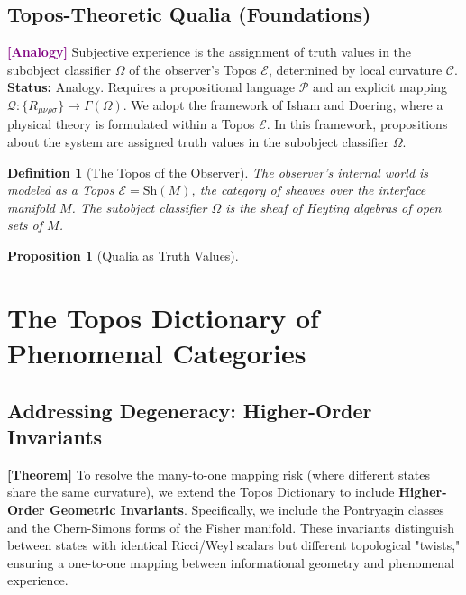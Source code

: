 \documentclass[11pt,titlepage]{article}
\newcommand{\curvature}{\mathcal{C}}
\newcommand{\topos}{\mathcal{E}}
\newcommand{\classifier}{\Omega}
\newcommand{\tagtheo}{\textcolor{green!60!black}{\textbf{[Theorem]}} }
\newcommand{\taganal}{\textcolor{purple}{\textbf{[Analogy]}} }
\newtheorem{proposition}{Proposition}[section]
\newtheorem{definition}{Definition}[section]
\begin{document}
\subsection{Topos-Theoretic Qualia (Foundations)}
\taganal Subjective experience is the assignment of truth values in the subobject classifier $\classifier$ of the observer's Topos $\topos$, determined by local curvature $\curvature$.
\textbf{Status:} Analogy. Requires a propositional language $\mathcal{P}$ and an explicit mapping $\mathcal{Q}: \{R_{\mu\nu\rho\sigma}\} \to \Gamma(\Omega)$. We adopt the framework of Isham and Doering, where a physical theory is formulated within a Topos $\topos$. In this framework, propositions about the system are assigned truth values in the subobject classifier $\classifier$.

\begin{definition}[The Topos of the Observer]
The observer's internal world is modeled as a Topos $\topos = \text{Sh}(M)$, the category of sheaves over the interface manifold $M$. The subobject classifier $\classifier$ is the sheaf of Heyting algebras of open sets of $M$.
\end{definition}

\begin{proposition}[Qualia as Truth Values]

\end{proposition}


\section{The Topos Dictionary of Phenomenal Categories}
\subsection{Addressing Degeneracy: Higher-Order Invariants}
\tagtheo To resolve the many-to-one mapping risk (where different states share the same curvature), we extend the Topos Dictionary to include \textbf{Higher-Order Geometric Invariants}. Specifically, we include the Pontryagin classes and the Chern-Simons forms of the Fisher manifold. These invariants distinguish between states with identical Ricci/Weyl scalars but different topological "twists," ensuring a one-to-one mapping between informational geometry and phenomenal experience.


\end{document}
